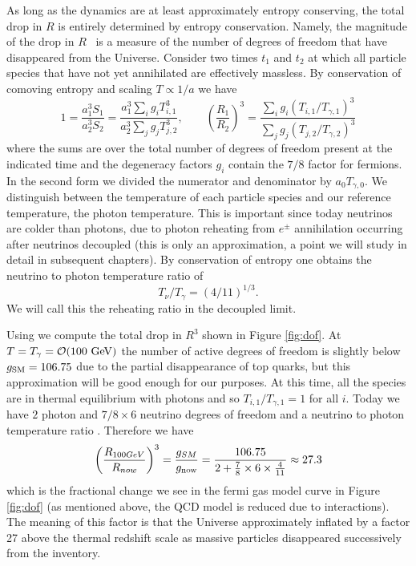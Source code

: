 As long as the dynamics are at least approximately entropy conserving, the total drop in $R$ is entirely determined by entropy conservation. Namely, the magnitude of the drop in $R$~ is a measure of the number of degrees of freedom that have disappeared from the Universe. Consider two times $t_1$ and $t_2$ at which all particle species that have not yet annihilated are effectively massless. By conservation of comoving entropy and scaling $T\propto 1/a$ we have
\begin{equation}\label{r_ratio}
1=\frac{a_1^3S_{1}}{a_2^3 S_2}=\frac{a_1^3\sum_ig_i T_{i,1}^3}{a_2^3\sum_j g_j T_{j,2}^3},\qquad \left(\frac{R_1}{R_2}\right)^3=\frac{\sum_ig_i (T_{i,1}/T_{\gamma,1})^3}{\sum_j g_j (T_{j,2}/T_{\gamma,2})^3}
\end{equation}
where the sums are over the total number of degrees of freedom present at the indicated time and the degeneracy factors $g_i$ contain the $7/8$ factor for fermions. In the second form we divided the numerator and denominator by $a_{0}T_{\gamma,0}$. We distinguish between the temperature of each particle species and our reference temperature, the photon temperature. This is important since today neutrinos are colder than photons, due to photon reheating from $e^\pm$ annihilation occurring after neutrinos decoupled (this is only an approximation, a point we will study in detail in subsequent chapters). By conservation of entropy one obtains the neutrino to photon temperature ratio of
\begin{equation}\label{T_nu_T_gamma}
T_\nu/T_\gamma=({4}/{11})^{1/3}.
\end{equation}
We will call this the reheating ratio in the decoupled limit. 

Using  we compute the total drop in $R^3$ shown in Figure \ref{fig:dof}. At $T=T_\gamma=\mathcal{O}(100\text{ GeV})$ the number of active degrees of freedom is slightly below $g_{\rm SM}=106.75$ due to the partial disappearance of top quarks, but this approximation will be good enough for our purposes. At this time, all the species are in thermal equilibrium with photons and so $T_{i,1}/T_{\gamma,1}=1$ for all $i$. Today we have $2$ photon and $7/8\times 6$ neutrino degrees of freedom and a neutrino to photon temperature ratio . Therefore we have
\begin{equation}
\left(\frac{R_{100GeV}}{R_{now}}\right)^3= \frac{g_{SM}}{g_{\rm now}}=\frac{106.75}{2+\frac{7}{8}\times 6\times \frac{4}{11}}\approx 27.3
\end{equation}
which is the fractional change we see in the fermi gas model curve in Figure \ref{fig:dof} (as mentioned above, the QCD model is reduced due to interactions). The meaning of this factor is that the Universe approximately inflated by a factor 27 above the thermal  redshift scale as massive particles disappeared successively from the inventory. 

